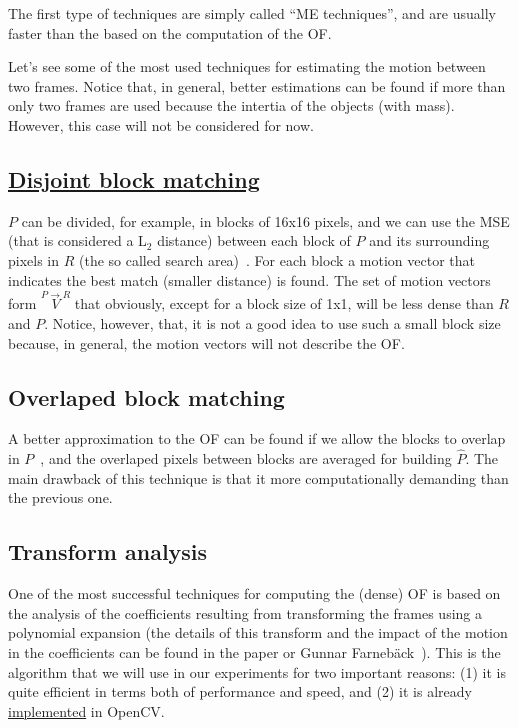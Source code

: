 The first type of techniques are simply called ``ME techniques'', and
are usually faster than the based on the computation of the OF.


Let's see some of the most used techniques for estimating the motion
between two frames. Notice that, in general, better estimations can be
found if more than only two frames are used because the intertia of
the objects (with mass). However, this case will not be considered for
now.

\subsection{\href{https://vicente-gonzalez-ruiz.github.io/video_compression/\#x1-40003}{Disjoint block matching}}
$P$ can be divided, for example, in blocks of 16x16 pixels, and we can
use the MSE (that is considered a L$_2$ distance) between each block
of $P$ and its surrounding pixels in $R$ (the so called search
area)~\cite{zhu2000new}. For each block a motion vector that indicates
the best match (smaller distance) is found. The set of motion vectors
form $\overset{P\rightarrow R}{V}$ that obviously, except for a block
size of 1x1, will be less dense than $R$ and $P$. Notice, however,
that, it is not a good idea to use such a small block size because, in
general, the motion vectors will not describe the OF.

\subsection{Overlaped block matching}
A better approximation to the OF can be found if we allow
the blocks to overlap in $P$~\cite{orchard1994overlapped}, and the
overlaped pixels between blocks are averaged for building
$\hat{P}$. The main drawback of this technique is that it more
computationally demanding than the previous one.

\subsection{Transform analysis}
One of the most successful techniques for computing the (dense)
OF is based on the analysis of the coefficients resulting
from transforming the frames using a polynomial expansion (the details
of this transform and the impact of the motion in the coefficients can
be found in the paper or Gunnar
Farneb{\"a}ck~\cite{farneback2003two}). This is the algorithm that we
will use in our experiments for two important reasons: (1) it is quite
efficient in terms both of performance and speed, and (2) it is
already
\href{https://docs.opencv.org/3.4/d4/dee/tutorial_optical_flow.html}{implemented}
in OpenCV.

